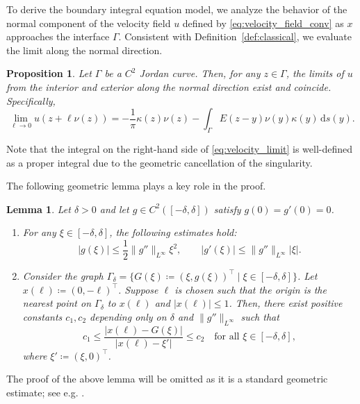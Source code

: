 \documentclass{article}
\newtheorem{lemma}[theorem]{Lemma}
\newtheorem{proposition}[theorem]{Proposition}
\theoremstyle{remark}
\theoremstyle{definition}
\numberwithin{equation}{section}
\begin{document}
To derive the boundary integral equation model, we analyze the behavior of the normal component of the velocity field $u$ defined by \eqref{eq:velocity_field_conv} as $x$ approaches the interface $\Gamma$.
Consistent with Definition~\ref{def:classical}, we evaluate the limit along the normal direction.

\begin{proposition}
\label{prop:velocity-limit}
Let $\Gamma$ be a $C^2$ Jordan curve. Then, for any $z \in \Gamma$, the limits of $u$ from the interior and exterior along the normal direction exist and coincide. Specifically,
\begin{equation}
    \lim_{\ell \to 0} u(z + \ell \nu(z)) = -\frac{1}{\pi} \kappa(z) \nu(z) - \int_\Gamma E(z - y) \nu(y) \kappa(y) \,\mathrm{d}s(y).
    \label{eq:velocity_limit}
\end{equation}
\end{proposition}

Note that the integral on the right-hand side of \eqref{eq:velocity_limit} is well-defined as a proper integral due to the geometric cancellation of the singularity.

The following geometric lemma plays a key role in the proof.

\begin{lemma}
\label{lem:ratio_bound}
Let $\delta > 0$ and let $g \in C^2([-\delta, \delta])$ satisfy $g(0) = g'(0) = 0$.
\begin{enumerate}
    \item[{\rm (i)}] For any $\xi \in [-\delta, \delta]$, the following estimates hold:
    \begin{equation*}
        |g(\xi)| \le \frac{1}{2} \| g'' \|_{L^\infty} \xi^2, \qquad
        |g'(\xi)| \le \| g'' \|_{L^\infty} |\xi|.
    \end{equation*}
    \item[{\rm (ii)}] Consider the graph $\Gamma_\delta = \{ G(\xi) \coloneqq (\xi, g(\xi))^\top \mid \xi \in [-\delta, \delta] \}$.
    Let $x(\ell) \coloneqq (0, -\ell)^\top$. Suppose $\ell$ is chosen such that the origin is the nearest point on $\Gamma_\delta$ to $x(\ell)$ and $|x(\ell)| \le 1$. Then, there exist positive constants $c_1, c_2$ depending only on $\delta$ and $\| g'' \|_{L^\infty}$ such that
    \begin{equation*}
        c_1 \le \frac{|x(\ell) - G(\xi)|}{|x(\ell) - \xi'|} \le c_2 \quad \text{for all } \xi \in [-\delta, \delta],
    \end{equation*}
    where $\xi' \coloneqq (\xi, 0)^\top$.
\end{enumerate}
\end{lemma}
The proof of the above lemma will be omitted as it is a standard geometric estimate; see e.g. \cite[p.~135]{friedman1964partial}.
\end{document}
